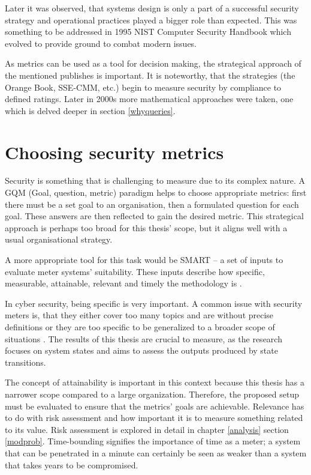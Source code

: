 Later it was observed, that systems design is only a part of a
successful security strategy and operational practices played a
bigger role than expected. This was something to be addressed in 1995 NIST
Computer Security Handbook which evolved to provide ground to
combat modern issues. \cite{bayuk2013measuring}

As metrics can be used as a tool for decision making, the strategical
approach of the mentioned publishes is important. It is noteworthy, that
the strategies (the Orange Book, SSE-CMM, etc.) begin to measure
security by compliance to defined ratings. Later in 2000s more
mathematical approaches were taken, one which is delved deeper in
section \ref{whyqueries}. \cite{bayuk2013measuring}

\section{Choosing security metrics} \label{choosingsecmet}

Security is something that is challenging to measure due to its
complex nature. A GQM (Goal, question, metric) paradigm helps to
choose appropriate metrics: first there must be a set goal to an
organisation, then a formulated question for each goal. These answers
are then reflected to gain the desired metric. This strategical
approach is perhaps too broad for this thesis' scope, but it aligns well
with a usual organisational strategy. \cite{papazov2019cybersecurity}

A more appropriate tool for this task would be SMART – a set of inputs
to evaluate meter systems' suitability. These inputs describe how
specific, measurable, attainable, relevant and timely the methodology
is \cite{payne2006guide}.

In cyber security, being specific is very important. A common issue
with security meters is, that they either cover too many topics and
are without precise definitions or they are too specific to be
generalized to a broader scope of situations
\cite{wang2005information}. The results of this thesis are crucial to
measure, as the research focuses on system states and aims to assess
the outputs produced by state transitions.

The concept of attainability is important in this context because this
thesis has a narrower scope compared to a large
organization. Therefore, the proposed setup must be evaluated to
ensure that the metrics' goals are achievable. Relevance has to do
with risk assessment and how important it is to measure something related
to its value. Risk assessment is explored in detail  in chapter
\ref{analysis} section \ref{modprob}. Time-bounding signifies the
importance of time as a meter; a system that can be penetrated in a
minute can certainly be seen as weaker than a system that takes years
to be compromised.

